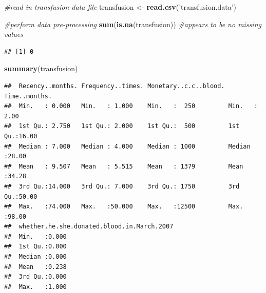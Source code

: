 \documentclass[
]{article}
\newenvironment{Shaded}{\begin{snugshade}}{\end{snugshade}}
\newcommand{\CommentTok}[1]{\textcolor[rgb]{0.56,0.35,0.01}{\textit{#1}}}
\newcommand{\DataTypeTok}[1]{\textcolor[rgb]{0.13,0.29,0.53}{#1}}
\newcommand{\FloatTok}[1]{\textcolor[rgb]{0.00,0.00,0.81}{#1}}
\newcommand{\KeywordTok}[1]{\textcolor[rgb]{0.13,0.29,0.53}{\textbf{#1}}}
\newcommand{\NormalTok}[1]{#1}
\newcommand{\OperatorTok}[1]{\textcolor[rgb]{0.81,0.36,0.00}{\textbf{#1}}}
\newcommand{\StringTok}[1]{\textcolor[rgb]{0.31,0.60,0.02}{#1}}
\begin{document}
\begin{Shaded}
\begin{Highlighting}[]
\CommentTok{#read in transfusion data file }
\NormalTok{transfusion <-}\StringTok{ }\KeywordTok{read.csv}\NormalTok{(}\StringTok{'transfusion.data'}\NormalTok{)}

\CommentTok{#perform data pre-processing }
\KeywordTok{sum}\NormalTok{(}\KeywordTok{is.na}\NormalTok{(transfusion)) }\CommentTok{#appears to be no missing values }
\end{Highlighting}
\end{Shaded}

\begin{verbatim}
## [1] 0
\end{verbatim}

\begin{Shaded}
\begin{Highlighting}[]
\KeywordTok{summary}\NormalTok{(transfusion)}
\end{Highlighting}
\end{Shaded}

\begin{verbatim}
##  Recency..months. Frequency..times. Monetary..c.c..blood. Time..months.  
##  Min.   : 0.000   Min.   : 1.000    Min.   :  250         Min.   : 2.00  
##  1st Qu.: 2.750   1st Qu.: 2.000    1st Qu.:  500         1st Qu.:16.00  
##  Median : 7.000   Median : 4.000    Median : 1000         Median :28.00  
##  Mean   : 9.507   Mean   : 5.515    Mean   : 1379         Mean   :34.28  
##  3rd Qu.:14.000   3rd Qu.: 7.000    3rd Qu.: 1750         3rd Qu.:50.00  
##  Max.   :74.000   Max.   :50.000    Max.   :12500         Max.   :98.00  
##  whether.he.she.donated.blood.in.March.2007
##  Min.   :0.000                             
##  1st Qu.:0.000                             
##  Median :0.000                             
##  Mean   :0.238                             
##  3rd Qu.:0.000                             
##  Max.   :1.000
\end{verbatim}

\begin{Shaded}
\end{Shaded}
\end{document}
